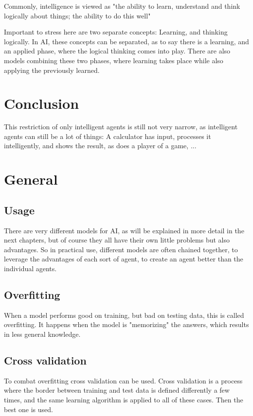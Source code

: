 Commonly, intelligence is viewed as "the ability to learn, understand and think logically about things; the ability to do this well" 

Important to stress here are two separate concepts: Learning, and thinking logically.
In AI, these concepts can be separated, as to say there is a learning, and an applied phase, where the logical thinking comes into play. %
There are also models combining these two phases, where learning takes place while also applying the previously learned. %

\section{Conclusion}
This restriction of only intelligent agents is still not very narrow, as intelligent agents can still be a lot of things: A calculator has input, processes it intelligently, and shows the result, as does a player of a game, ...

\section{General}
\subsection{Usage}
There are very different models for AI, as will be explained in more detail in the next chapters, but of course they all have their own little problems but also advantages. So in practical use, different models are often chained together, to leverage the advantages of each sort of agent, to create an agent better than the individual agents. %
\subsection{Overfitting}
When a model performs good on training, but bad on testing data, this is called overfitting. It happens when the model is "memorizing" the answers, which results in less general knowledge.
\subsection{Cross validation}
To combat overfitting cross validation can be used. Cross validation is a process where the border between training and test data is defined differently a few times, and the same learning algorithm is applied to all of these cases. Then the best one is used.